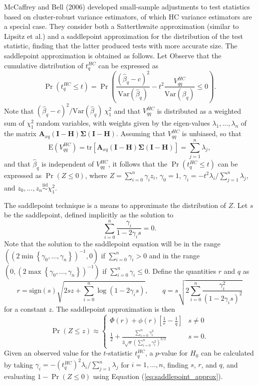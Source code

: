 \documentclass{article}\usepackage[]{graphicx}\usepackage[]{color}
\newcommand{\E}{\text{E}}
\newcommand{\Var}{\text{Var}}
\newcommand{\tr}{\text{tr}}
\newcommand{\iid}{\stackrel{\text{iid}}{\sim}}
\newcommand{\bm}{\mathbf}
\newcommand{\bs}{\boldsymbol}
\begin{document}
McCaffrey and Bell (2006) developed small-sample adjustments to test statistics based on cluster-robust variance estimators, of which HC variance estimators are a special case. They consider both a Satterthwaite approximation (similar to Lipsitz et al.) and a saddlepoint approximation for the distribution of the test statistic, finding that the latter produced tests with more accurate size. The saddlepoint approximation is obtained as follows. Let Observe that the cumulative distribution of $t^{HC}_q$ can be expressed as \[
\Pr\left(t^{HC}_q \leq t\right) = \Pr\left(\frac{\left(\hat\beta_q - c\right)^2}{\Var(\hat\beta_q)} - t^2 \frac{V^{HC}_{qq}}{\Var(\hat\beta_q)} \leq 0\right). \]
Note that $\left(\hat\beta_q - c\right)^2 / \Var(\hat\beta_q) ~ \chi^2_1$ and that $V^{HC}_{qq}$ is distributed as a weighted sum of $\chi^2_1$ random variables, with weights given by the eigen-values $\lambda_1,...,\lambda_n$ of the matrix $\bm{A}_{xq} \left(\bm{I} - \bm{H}\right)\bs\Sigma\left(\bm{I} - \bm{H}\right)$. Assuming that $V^{HC}_{qq}$ is unbiased, so that \[
\E\left(V^{HC}_{qq}\right) = \tr\left[\bm{A}_{xq} \left(\bm{I} - \bm{H}\right)\bs\Sigma\left(\bm{I} - \bm{H}\right)\right] = \sum_{j=1}^n \lambda_j, \]
and that $\hat\beta_q$ is independent of $V^{HC}_{qq}$, it follows that the $\Pr\left(t^{HC}_q \leq t\right)$ can be expressed as $\Pr(Z \leq 0)$, where $Z = \sum_{i=0}^n \gamma_i z_i$,
$\gamma_0 = 1$, $\gamma_i = -t^2 \lambda_i / \sum_{j=1}^n \lambda_j$, and $z_0,...,z_n \iid \chi^2_1$.

The saddlepoint technique is a means to approximate the distribution of $Z$. Let $s$ be the saddlepoint, defined implicitly as the solution to \[
\sum_{i=0}^n \frac{\gamma_i}{1 - 2 \gamma_i s} = 0. \]
Note that the solution to the saddlepoint equation will be in the range $\left(\left(2 \min\left\{\gamma_0,...,\gamma_n\right\}\right)^{-1}, 0 \right)$ if $\sum_{i=0}^n \gamma_i > 0$ and in the range $\left(0, \left(2 \max\left\{\gamma_0,...,\gamma_n\right\}\right)^{-1}\right)$ if $\sum_{i=0}^n \gamma_i \leq 0$. Define the quantities $r$ and $q$ as \[
r = \text{sign}(s)\sqrt{2sz + \sum_{i=0}^n \log\left(1 - 2\gamma_i s\right)}, \qquad q = s \sqrt{2 \sum_{i=0}^n \frac{\gamma_i^2}{\left(1 - 2 \gamma_i s\right)^2}} \]
for a constant $z$. The saddlepoint approximation is then 
\begin{equation}
\label{eq:saddlepoint_approx}
\Pr(Z \leq z) \approx \begin{cases}\Phi(r) + \phi(r)\left[\frac{1}{r} - \frac{1}{q}\right] & s \neq 0 \\
\frac{1}{2} + \frac{\sum_{i=0}^n \gamma_i^3}{3 \sqrt\pi \left(\sum_{i=0}^n \gamma_i^2\right)^{3/2}} & s = 0. \end{cases}
\end{equation}
Given an observed value for the $t$-statistic $t^{HC}_q$, a $p$-value for $H_0$ can be calculated by taking $\gamma_i = -\left(t^{HC}_q\right)^2 \lambda_i / \sum_{j=1}^n \lambda_j$ for $i = 1,...,n$, finding $s$, $r$, and $q$, and evaluating $1 - \Pr(Z \leq 0)$ using Equation (\ref{eq:saddlepoint_approx}).
\end{document}
